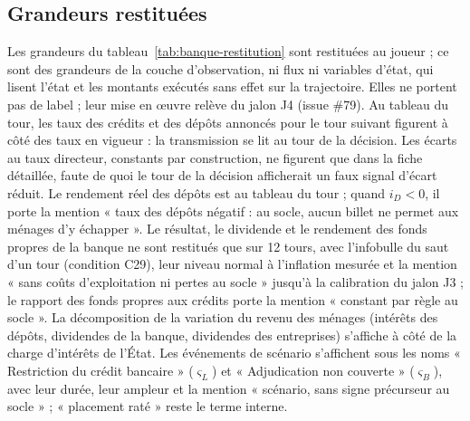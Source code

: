 \documentclass[11pt,a4paper]{article}
\begin{document}
\subsection{Grandeurs restituées}
\label{sec:banque-restitution}
\begin{proposee}
Les grandeurs du tableau~\ref{tab:banque-restitution} sont restituées au joueur ; ce sont des grandeurs de la couche d'observation, ni flux ni variables d'état, qui lisent l'état et les montants exécutés sans effet sur la trajectoire. Elles ne portent pas de label ; leur mise en œuvre relève du jalon J4 (issue \#79). Au tableau du tour, les taux des crédits et des dépôts annoncés pour le tour suivant figurent à côté des taux en vigueur : la transmission se lit au tour de la décision. Les écarts au taux directeur, constants par construction, ne figurent que dans la fiche détaillée, faute de quoi le tour de la décision afficherait un faux signal d'écart réduit. Le rendement réel des dépôts est au tableau du tour ; quand $i_D < 0$, il porte la mention « taux des dépôts négatif : au socle, aucun billet ne permet aux ménages d'y échapper ». Le résultat, le dividende et le rendement des fonds propres de la banque ne sont restitués que sur 12 tours, avec l'infobulle du saut d'un tour (condition C29), leur niveau normal à l'inflation mesurée et la mention « sans coûts d'exploitation ni pertes au socle » jusqu'à la calibration du jalon J3 ; le rapport des fonds propres aux crédits porte la mention « constant par règle au socle ». La décomposition de la variation du revenu des ménages (intérêts des dépôts, dividendes de la banque, dividendes des entreprises) s'affiche à côté de la charge d'intérêts de l'État. Les événements de scénario s'affichent sous les noms « Restriction du crédit bancaire » ($\varsigma_L$) et « Adjudication non couverte » ($\varsigma_B$), avec leur durée, leur ampleur et la mention « scénario, sans signe précurseur au socle » ; « placement raté » reste le terme interne.


\end{proposee}
\end{document}
